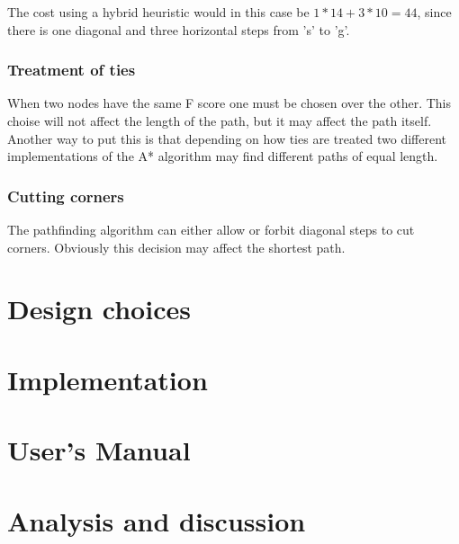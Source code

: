 \documentclass[12pt, a4paper]{article}
\begin{document}
The cost using a hybrid heuristic would in this case be $ 1*14 + 3*10 = 44 $,
since there is one diagonal and three horizontal steps from 's' to 'g'.


\subsubsection{Treatment of ties}

When two nodes have the same F score one must be chosen over the other. This
choise will not affect the length of the path, but it may affect the path
itself. Another way to put this is that depending on how ties are treated two
different implementations of the A* algorithm may find different paths of equal
length. \cite{astar2}


\subsubsection{Cutting corners}

The pathfinding algorithm can either allow or forbit diagonal steps to cut
corners. Obviously this decision may affect the shortest path. \cite{astar2}


\section{Design choices}


\section{Implementation}


\section{User's Manual}



\section{Analysis and discussion}

\pagebreak


\end{document}
